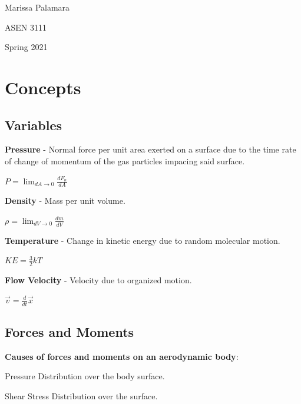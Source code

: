 \documentclass{article}
\begin{document}
\begin{multicols*}{2}
    Marissa Palamara\par 
    ASEN 3111\par 
    Spring 2021
    \vspace{-0.5cm}

\section*{Concepts}

\subsection*{Variables}
\textbf{Pressure} - Normal force per unit area exerted on a surface due to the time rate of change of momentum of the gas particles impacing said surface.\par
$P = \lim_{dA\to 0}\frac{dF_n}{dA}$\par
\textbf{Density} - Mass per unit volume.\par
$\rho = \lim_{dV\to 0} \frac{dm}{dV}$\par
\textbf{Temperature} - Change in kinetic energy due to random molecular motion.\par
$KE = \frac{3}{2}kT$\par
\textbf{Flow Velocity} - Velocity due to organized motion.\par
$\vec{v} = \frac{d}{dt}\vec{x}$\par

\subsection*{Forces and Moments}
\textbf{Causes of forces and moments on an aerodynamic body}:\par
Pressure Distribution over the body surface.\par
Shear Stress Distribution over the surface.\par


\end{multicols*}
\end{document}
